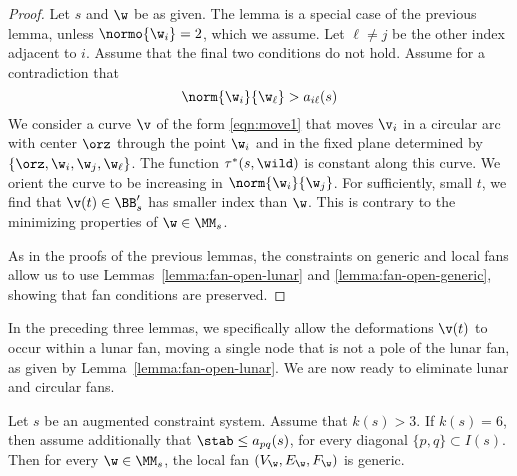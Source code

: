 \begin{proof} 
Let $s$ and $\w$ be as given.  The lemma is a special
case of the previous lemma, unless $\normo{\w_i}=2$, which we assume.
Let $\ell\ne j$ be the other index adjacent to $i$.
Assume that the final
two conditions do not hold.
Assume for a contradiction that 
\[
\norm{\w_i}{\w_\ell}>a_{i \ell}(s)
\]
We consider a curve $\v$ of the form \eqref{eqn:move1} that moves $\v_i$
in a circular arc with center $\orz$ through the point $\w_i$ and in
the fixed plane determined by $\{\orz,\w_i,\w_j,\w_{\ell}\}$.  
The function $\tau^*(s,\wild)$ is
constant along this curve.  We orient the curve to be increasing
in $\norm{\w_i}{\w_{j}}$.  For sufficiently, small $t$, we find that
$\v(t)\in\BB'_s$ has smaller index than $\w$.  This is contrary to the minimizing
properties of $\w\in\MM_s$.

As in the proofs of the previous lemmas, the constraints on generic and local fans
allow us to use Lemmas~\ref{lemma:fan-open-lunar} and
\ref{lemma:fan-open-generic}, showing that fan conditions are preserved.
\end{proof}

In the preceding three lemmas, we specifically allow the deformations
$\v(t)$ to occur within a lunar fan, moving a single node that is not a pole
of the lunar fan, as given by Lemma~\ref{lemma:fan-open-lunar}.
We are now ready to eliminate  lunar and circular
fans.

\begin{lemma}\label{lemma:bjo} 
Let $s$ be an augmented constraint system.
Assume that $k(s)>3$.
If $k(s)=6$, then assume additionally that
$\stab\le a_{pq}(s)$, for every diagonal $\{p,q\}\subset I(s)$.
Then for every  $\w\in\MM_s$,  the local fan $(V_\w,E_\w,F_\w)$ is generic.
\end{lemma}

